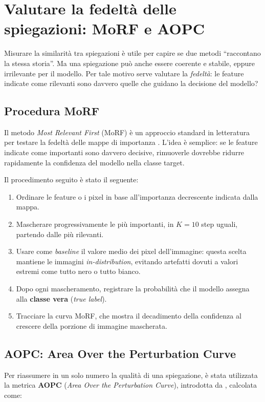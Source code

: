 \documentclass[12pt,a4paper,oneside]{report}
\numberwithin{figure}{chapter}
\numberwithin{table}{chapter}
\begin{document}
\chapter{Valutare la fedeltà delle spiegazioni: MoRF e AOPC}

Misurare la similarità tra spiegazioni è utile per capire se due metodi
``raccontano la stessa storia''. Ma una spiegazione può anche essere coerente e
stabile, eppure irrilevante per il modello. Per tale motivo serve valutare la
\emph{fedeltà}: le feature indicate come rilevanti sono davvero quelle che
guidano la decisione del modello?

\section{Procedura MoRF}
\label{sec:morf_aopc}
Il metodo \emph{Most Relevant First} (MoRF) è un approccio standard in
letteratura per testare la fedeltà delle mappe di importanza
\citep{samek2016evaluating,samek2017explainable}. L’idea è semplice: se le
feature indicate come importanti sono davvero decisive, rimuoverle dovrebbe
ridurre rapidamente la confidenza del modello nella classe target.

Il procedimento seguito è stato il seguente:
\begin{enumerate}
      \item Ordinare le feature o i pixel in base all’importanza decrescente indicata dalla
            mappa.
      \item Mascherare progressivamente le più importanti, in $K=10$ step uguali, partendo
            dalle più rilevanti.
      \item Usare come \emph{baseline} il valore medio dei pixel dell’immagine: questa
            scelta mantiene le immagini \emph{in-distribution}, evitando artefatti dovuti a
            valori estremi come tutto nero o tutto bianco.
      \item Dopo ogni mascheramento, registrare la probabilità che il modello assegna alla
            \textbf{classe vera} (\textit{true label}).
      \item Tracciare la curva MoRF, che mostra il decadimento della confidenza al crescere
            della porzione di immagine mascherata.
\end{enumerate}

\section{AOPC: Area Over the Perturbation Curve}
Per riassumere in un solo numero la qualità di una spiegazione, è stata
utilizzata la metrica \textbf{AOPC} (\emph{Area Over the Perturbation Curve}),
introdotta da \citet{samek2016evaluating}, calcolata come:
\end{document}
